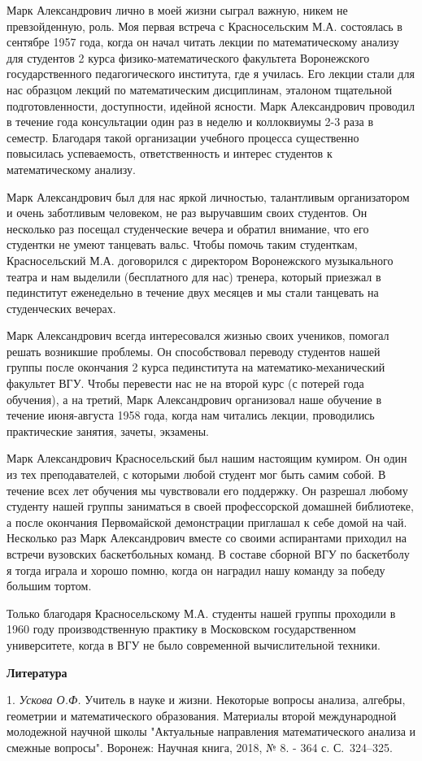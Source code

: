 Марк Александрович лично в моей жизни сыграл важную, никем не превзойденную, роль. Моя первая встреча с Красносельским М.А.
состоялась в сентябре 1957 года, когда он начал читать лекции по математическому анализу для студентов 2 курса
физико-математического факультета Воронежского государственного педагогического института, где я училась. Его лекции стали для нас
образцом лекций по математическим дисциплинам, эталоном тщательной подготовленности, доступности, идейной ясности. Марк
Александрович проводил в течение года консультации один раз в неделю и коллоквиумы 2-3 раза в семестр. Благодаря такой
организации учебного процесса существенно повысилась успеваемость, ответственность и интерес студентов к
математическому анализу.

Марк Александрович был для нас яркой личностью, талантливым организатором и очень заботливым человеком, не раз выручавшим
своих студентов. Он несколько раз посещал студенческие вечера и обратил внимание, что его студентки не умеют танцевать
вальс. Чтобы помочь таким студенткам, Красносельский М.А. договорился с директором Воронежского музыкального театра и нам выделили
(бесплатного для нас) тренера, который приезжал в пединститут еженедельно в течение двух месяцев и мы стали танцевать на
студенческих вечерах.

Марк Александрович всегда интересовался жизнью своих учеников, помогал решать возникшие проблемы. Он способствовал
переводу студентов нашей группы после окончания 2 курса пединститута на математико-механический факультет ВГУ. Чтобы
перевести нас не на второй курс (с потерей года обучения), а на третий, Марк Александрович организовал наше обучение
в течение июня-августа 1958 года, когда нам читались лекции, проводились практические занятия, зачеты, экзамены.

Марк Александрович Красносельский был нашим настоящим кумиром. Он один из тех преподавателей, с которыми любой студент
мог быть самим собой. В течение всех лет обучения мы чувствовали его поддержку. Он разрешал любому студенту нашей
группы заниматься в своей профессорской домашней библиотеке, а после окончания Первомайской демонстрации приглашал
к себе домой на чай. Несколько раз Марк Александрович вместе со своими аспирантами приходил на встречи вузовских
баскетбольных команд. В составе сборной ВГУ по баскетболу я тогда играла и хорошо помню, когда он наградил нашу
команду за победу большим тортом.

Только благодаря Красносельскому М.А. студенты нашей группы проходили в 1960 году производственную практику в Московском
государственном университете, когда в ВГУ не было современной вычислительной техники.


\smallskip \centerline {\bf Литература} \nopagebreak

1. {\it Ускова О.Ф.} Учитель в науке и жизни. Некоторые вопросы анализа, алгебры, геометрии и математического образования.
Материалы второй международной молодежной научной школы "Актуальные направления математического анализа и смежные вопросы".
Воронеж: Научная книга, 2018, № 8. - 364 с. С.~324--325.


